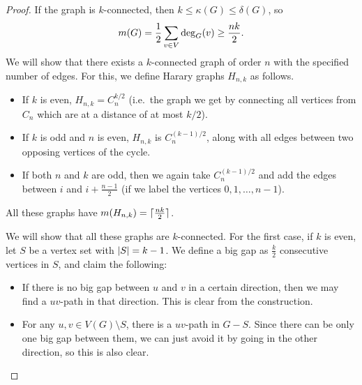 \begin{proof}
  If the graph is $k$-connected, then $k \le \kappa(G) \le \delta(G)$, so
  \[
	m(G) = \frac{1}{2} \sum_{v \in V} \deg_G(v) \ge \frac{nk}{2}.
  \]
  We will show that there exists a $k$-connected graph of order $n$ with the
  specified number of edges.
  For this, we define Harary graphs $H_{n,k}$ as follows.
  \begin{itemize}
  \item If $k$ is even, $H_{n,k} = C_n^{k/2}$ (i.e.~the graph we get by
	connecting all vertices from $C_n$ which are at a distance of at most $k/2$).
  \item If $k$ is odd and $n$ is even, $H_{n,k}$ is $C_n^{(k-1)/2}$, along with
	all edges between two opposing vertices of the cycle.
  \item If both $n$ and $k$ are odd, then we again take $C_n^{(k-1)/2}$ and add
	the edges between $i$ and $i + \frac{n-1}{2}$ (if we label the vertices $0,
	1, \ldots, n-1$).
  \end{itemize}
  All these graphs have $m(H_{n,k}) = \lceil \frac{nk}{2} \rceil$.

  We will show that all these graphs are $k$-connected.
  For the first case, if $k$ is even, let $S$ be a vertex set with $\left| S \right| =
  k-1$.
  We define a big gap as $\frac{k}{2}$ consecutive vertices in $S$, and claim
  the following:
  \begin{itemize}
  \item If there is no big gap between $u$ and $v$ in a certain direction, then
	we may find a $uv$-path in that direction.
	This is clear from the construction.
  \item For any $u,v \in V(G) \setminus S$, there is a $uv$-path in $G - S$.
	Since there can be only one big gap between them, we can just avoid it by
	going in the other direction, so this is also clear.
  \end{itemize}
\end{proof}

